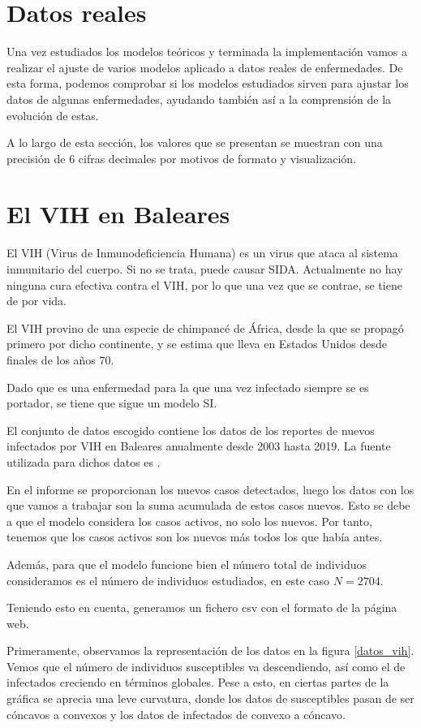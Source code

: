 \section{Datos reales}

Una vez estudiados los modelos teóricos y terminada la implementación vamos a realizar el ajuste de varios modelos aplicado a datos reales de enfermedades. De esta forma, podemos comprobar si los modelos estudiados sirven para ajustar los datos de algunas enfermedades, ayudando también así a la comprensión de la evolución de estas.

A lo largo de esta sección, los valores que se presentan se muestran con una precisión de $6$ cifras decimales por motivos de formato y visualización.

\section{El VIH en Baleares}

El VIH (Virus de Inmunodeficiencia Humana) es un virus que ataca al sistema inmunitario del cuerpo. Si no se trata, puede causar SIDA. Actualmente no hay ninguna cura efectiva contra el VIH, por lo que una vez que se contrae, se tiene de por vida.

El VIH provino de una especie de chimpancé de África, desde la que se propagó primero por dicho continente, y se estima que lleva en Estados Unidos desde finales de los años 70.

Dado que es una enfermedad para la que una vez infectado siempre se es portador, se tiene que sigue un modelo SI.

El conjunto de datos escogido contiene los datos de los reportes de nuevos infectados por VIH en Baleares anualmente desde 2003 hasta 2019. La fuente utilizada para dichos datos es \cite{datos_vih}.

En el informe se proporcionan los nuevos casos detectados, luego los datos con los que vamos a trabajar son la suma acumulada de estos casos nuevos. Esto se debe a que el modelo considera los casos activos, no solo los nuevos. Por tanto, tenemos que los casos activos son los nuevos más todos los que había antes.

Además, para que el modelo funcione bien el número total de individuos consideramos es el número de individuos estudiados, en este caso $N=2704$.

Teniendo esto en cuenta, generamos un fichero csv con el formato de la página web.

Primeramente, observamos la representación de los datos en la figura \ref{datos_vih}. Vemos que el número de individuos susceptibles va descendiendo, así como el de infectados creciendo en términos globales. Pese a esto, en ciertas partes de la gráfica se aprecia una leve curvatura, donde los datos de susceptibles pasan de ser cóncavos a convexos y los datos de infectados de convexo a cóncavo.

